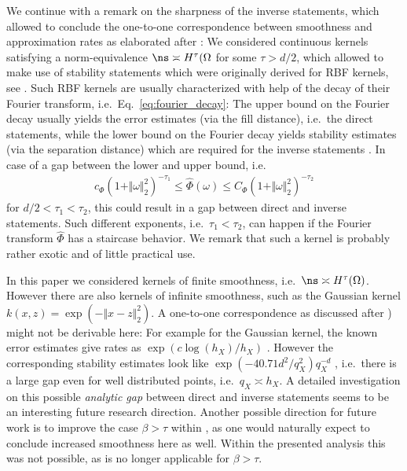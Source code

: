 \documentclass[a4paper, 10pt]{article}
\begin{document}
%
We continue with a remark on the sharpness of the inverse statements, which allowed to conclude the one-to-one correspondence between smoothness and approximation rates as elaborated after :
We considered continuous kernels satisfying a norm-equivalence $\ns \asymp H^\tau(\Omega$ for some $\tau > d/2$, 
which allowed to make use of stability statements which were originally derived for RBF kernels, see .
Such RBF kernels are usually characterized with help of the decay of their Fourier transform, i.e.\ Eq.~\eqref{eq:fourier_decay}:
The upper bound on the Fourier decay usually yields the error estimates (via the fill distance), i.e.\ the direct statements,
while the lower bound on the Fourier decay yields stability estimates (via the separation distance) which are required for the inverse statements \cite{schaback2002inverse, schaback1995error}.
In case of a gap between the lower and upper bound, i.e.
\begin{align*}
c_\Phi (1+\Vert \omega \Vert_2^2)^{-\tau_1} \leq \hat{\Phi}(\omega) \leq C_\Phi (1 + \Vert \omega \Vert_2^2)^{-\tau_2}
\end{align*}
for $d/2 < \tau_1 < \tau_2$,
this could result in a gap between direct and inverse statements.
Such different exponents, i.e.\ $\tau_1 < \tau_2$, can happen if the Fourier transform $\hat{\Phi}$ has a staircase behavior.
We remark that such a kernel is probably rather exotic and of little practical use.

%
%

In this paper we considered kernels of finite smoothness, i.e.\ $\ns \asymp H^\tau(\Omega)$.
However there are also kernels of infinite smoothness, such as the Gaussian kernel $k(x, z) = \exp(- \Vert x - z \Vert_2^2)$.
A one-to-one correspondence as discussed after ) might not be derivable here:
For example for the Gaussian kernel, the known error estimates give rates as $\exp(c \log(h_{X}) / h_{X})$ \cite[Theorem 11.22]{wendland2005scattered}.
However the corresponding stability estimates look like $\exp(-40.71d^2/q_X^2) q_X^{-d}$ \cite[Corollary 12.4]{wendland2005scattered}, 
i.e.\ there is a large gap even for well distributed points, i.e.\ $q_X \asymp h_{X}$.
A detailed investigation on this possible \textit{analytic gap} between direct and inverse statements seems to be an interesting future research direction.
Another possible direction for future work is to improve the case $\beta > \tau$ within , 
as one would naturally expect to conclude increased smoothness here as well.
Within the presented analysis this was not possible, as  is no longer applicable for $\beta > \tau$.
\end{document}
